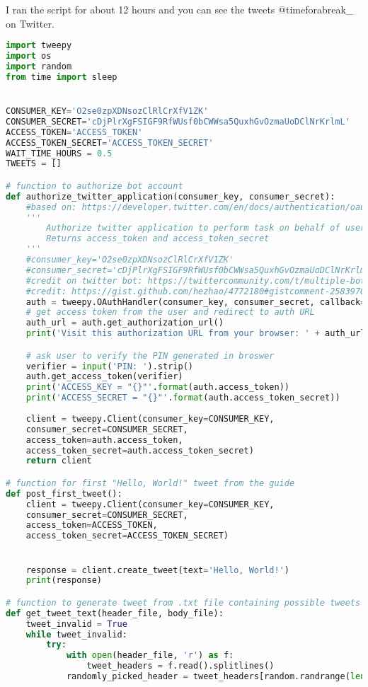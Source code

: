\documentclass[12pt]{article}
\begin{document}
I ran the script for about 12 hours and you can see the tweets @timeforabreak\_ on Twitter.

\begin{lstlisting}[language=Python, caption=Twitter bot Python script, label=lst:copy]
import tweepy
import os
import random
from time import sleep


CONSUMER_KEY='O2se0zpXDNsozClRlCrXfV1ZK'
CONSUMER_SECRET='cDjPlrXgFSIGF9RfWUsf0bCWWsa5QuxhGvOzmaUoDClNrKrlmL'
ACCESS_TOKEN='ACCESS_TOKEN'
ACCESS_TOKEN_SECRET='ACCESS_TOKEN_SECRET'
WAIT_TIME_HOURS = 0.5
TWEETS = []

# function to authorize bot account
def authorize_twitter_application(consumer_key, consumer_secret):
    #based on: https://developer.twitter.com/en/docs/authentication/oauth-1-0a/pin-based-oauth
    '''
        Authorize twitter application to perform task on behalf of user.
        Returns access_token and access_token_secret
    '''
    #consumer_key='O2se0zpXDNsozClRlCrXfV1ZK'
    #consumer_secret='cDjPlrXgFSIGF9RfWUsf0bCWWsa5QuxhGvOzmaUoDClNrKrlmL'
    #credit on twitter bot: https://twittercommunity.com/t/multiple-bot-accounts/128332
    #credit: https://gist.github.com/hezhao/4772180#gistcomment-2583970 , https://gist.github.com/hezhao/4772180#gistcomment-3213988
    auth = tweepy.OAuthHandler(consumer_key, consumer_secret, callback='oob')
    # get access token from the user and redirect to auth URL
    auth_url = auth.get_authorization_url()
    print('Visit this authorization URL from your browser: ' + auth_url)

    # ask user to verify the PIN generated in broswer
    verifier = input('PIN: ').strip()
    auth.get_access_token(verifier)
    print('ACCESS_KEY = "{}"'.format(auth.access_token))
    print('ACCESS_SECRET = "{}"'.format(auth.access_token_secret))
    
    client = tweepy.Client(consumer_key=CONSUMER_KEY,
    consumer_secret=CONSUMER_SECRET,
    access_token=auth.access_token,
    access_token_secret=auth.access_token_secret)
    return client

# function for first "Hello, World!" tweet from the guide
def post_first_tweet():
    client = tweepy.Client(consumer_key=CONSUMER_KEY,
    consumer_secret=CONSUMER_SECRET,
    access_token=ACCESS_TOKEN,
    access_token_secret=ACCESS_TOKEN_SECRET)


    response = client.create_tweet(text='Hello, World!')
    print(response)

# function to generate tweet from .txt file containing possible tweets
def get_tweet_text(header_file, body_file):
    tweet_invalid = True
    while tweet_invalid:
        try:
            with open(header_file, 'r') as f:
                tweet_headers = f.read().splitlines()
            randomly_picked_header = tweet_headers[random.randrange(len(tweet_headers))]
        

\end{lstlisting}
\end{document}
